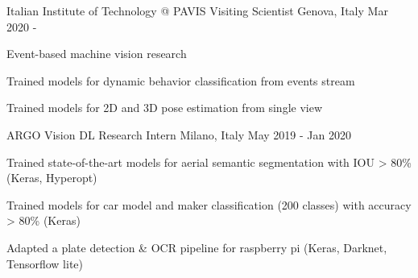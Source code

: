 

\begin{cventries}

  \cventry
  {Italian Institute of Technology @ PAVIS} %
  {Visiting Scientist } %
  {Genova, Italy} %
  {Mar 2020 - } %
  {
    \begin{cvitems} %
    \item Event-based machine vision research
    \item Trained models for dynamic behavior classification from
      events stream
    \item Trained models for 2D and 3D pose estimation from single view
    \end{cvitems}
  }

  \cventry
  {ARGO Vision} %
  {DL Research Intern} %
  {Milano, Italy} %
  {May 2019 - Jan 2020} %
  {
    \begin{cvitems} %
    \item Trained state-of-the-art models for aerial semantic segmentation  with IOU > 80\% (Keras, Hyperopt)
    \item Trained models for car model and maker classification (200 classes) with accuracy > 80\%   (Keras)
    \item Adapted a plate detection \& OCR pipeline for raspberry pi (Keras, Darknet, Tensorflow lite)
    \end{cvitems}
  }


\end{cventries}

